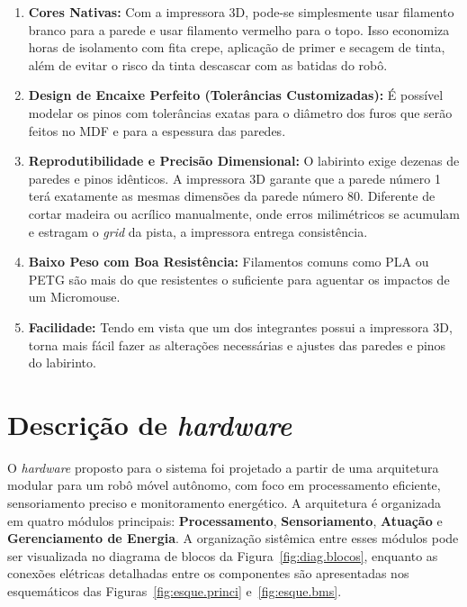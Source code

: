 \begin{enumerate}
    \item \textbf{Cores Nativas:} Com a impressora 3D, pode-se simplesmente usar filamento branco para a parede e usar filamento vermelho para o topo. Isso economiza horas de isolamento com fita crepe, aplicação de primer e secagem de tinta, além de evitar o risco da tinta descascar com as batidas do robô.
    
    \item \textbf{Design de Encaixe Perfeito (Tolerâncias Customizadas):} É possível modelar os pinos com tolerâncias exatas para o diâmetro dos furos que serão feitos no MDF e para a espessura das paredes.
    
    \item \textbf{Reprodutibilidade e Precisão Dimensional:} O labirinto exige dezenas de paredes e pinos idênticos. A impressora 3D garante que a parede número 1 terá exatamente as mesmas dimensões da parede número 80. Diferente de cortar madeira ou acrílico manualmente, onde erros milimétricos se acumulam e estragam o \textit{grid} da pista, a impressora entrega consistência.
    
    \item \textbf{Baixo Peso com Boa Resistência:} Filamentos comuns como PLA ou PETG são mais do que resistentes o suficiente para aguentar os impactos de um Micromouse.
    
    \item \textbf{Facilidade:} Tendo em vista que um dos integrantes possui a impressora 3D, torna mais fácil fazer as alterações necessárias e ajustes das paredes e pinos do labirinto.
\end{enumerate}

\section{Descrição de \textit{hardware}}

O \textit{hardware} proposto para o sistema foi projetado a partir de uma arquitetura modular
para um robô móvel autônomo, com foco em processamento eficiente, sensoriamento preciso e
monitoramento energético. A arquitetura é organizada em quatro módulos principais:
\textbf{Processamento}, \textbf{Sensoriamento}, \textbf{Atuação} e \textbf{Gerenciamento de
Energia}. A organização sistêmica entre esses módulos pode ser visualizada no diagrama de
blocos da Figura~\ref{fig:diag.blocos}, enquanto as conexões elétricas detalhadas entre os
componentes são apresentadas nos esquemáticos das Figuras~\ref{fig:esque.princi}
e~\ref{fig:esque.bms}.

